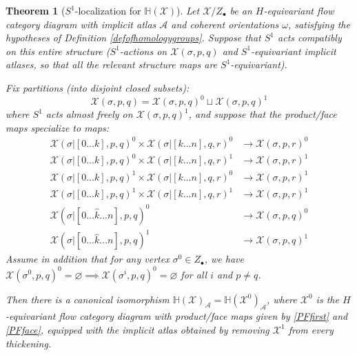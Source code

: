 \documentclass[12pt]{article}
\newtheorem{theorem}{Theorem}[subsection]
\theoremstyle{definition}
\theoremstyle{remark}
\numberwithin{equation}{subsection}
\newcommand{\X}{\mathcal X}
\newcommand{\HH}{\mathbb H}
\newcommand{\A}{\mathcal A}
\begin{document}
\begin{theorem}[$S^1$-localization for $\HH(\X)$]\label{circlelocalizationhomology}
Let $\X/Z_\bullet$ be an $H$-equivariant flow category diagram with implicit atlas $\A$ and coherent orientations $\omega$, satisfying the hypotheses of Definition \ref{defofhomologygroups}.  Suppose that $S^1$ acts compatibly on this entire structure ($S^1$-actions on $\X(\sigma,p,q)$ and $S^1$-equivariant implicit atlases, so that all the relevant structure maps are $S^1$-equivariant).

Fix partitions (into disjoint closed subsets):
\begin{equation}\label{partitionsfreefixedII}
\X(\sigma,p,q)=\X(\sigma,p,q)^0\sqcup\X(\sigma,p,q)^1
\end{equation}
where $S^1$ acts almost freely on $\X(\sigma,p,q)^1$, and suppose that the product/face maps specialize to maps:
\begin{align}
\label{PFfirst}\X(\sigma|[0\ldots k],p,q)^0\times\X(\sigma|[k\ldots n],q,r)^0&\to\X(\sigma,p,r)^0\\
\X(\sigma|[0\ldots k],p,q)^0\times\X(\sigma|[k\ldots n],q,r)^1&\to\X(\sigma,p,r)^1\\
\X(\sigma|[0\ldots k],p,q)^1\times\X(\sigma|[k\ldots n],q,r)^0&\to\X(\sigma,p,r)^1\\
\X(\sigma|[0\ldots k],p,q)^1\times\X(\sigma|[k\ldots n],q,r)^1&\to\X(\sigma,p,r)^1\\
\label{PFface}\X(\sigma|[0\ldots\hat k\ldots n],p,q)^0&\to\X(\sigma,p,q)^0\\
\label{PFlast}\X(\sigma|[0\ldots\hat k\ldots n],p,q)^1&\to\X(\sigma,p,q)^1
\end{align}
Assume in addition that for any vertex $\sigma^0\in Z_\bullet$, we have $\X(\sigma^0,p,q)^0=\varnothing\implies\X(\sigma^i,p,q)^0=\varnothing$ for all $i$ and $p\ne q$.

Then there is a canonical isomorphism $\HH(\X)_\A=\HH(\X^0)_\A$, where $\X^0$ is the $H$-equivariant flow category diagram with product/face maps given by \eqref{PFfirst} and \eqref{PFface}, equipped with the implicit atlas obtained by removing $\X^1$ from every thickening.
\end{theorem}
\end{document}

